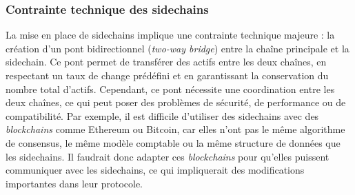 \subsubsection{Contrainte technique des sidechains}
La mise en place de sidechains implique une contrainte technique majeure : la création d'un pont bidirectionnel (\textit{two-way bridge}) entre la chaîne 
principale et la sidechain. Ce pont permet de transférer des \gls{actif}s entre les deux chaînes, en respectant un taux de change prédéfini et en garantissant la 
conservation du nombre total d'\gls{actif}s. Cependant, ce pont nécessite une coordination entre les deux chaînes, ce qui peut poser des problèmes de sécurité, de 
performance ou de compatibilité. Par exemple, il est difficile d'utiliser des sidechains avec des \textit{\gls{blockchain}s} comme Ethereum ou Bitcoin, car elles n'ont 
pas le même algorithme de consensus, le même modèle comptable ou la même structure de données que les sidechains. Il faudrait donc adapter ces \textit{\gls{blockchain}s} 
pour qu'elles puissent communiquer avec les sidechains, ce qui impliquerait des modifications importantes dans leur protocole.
